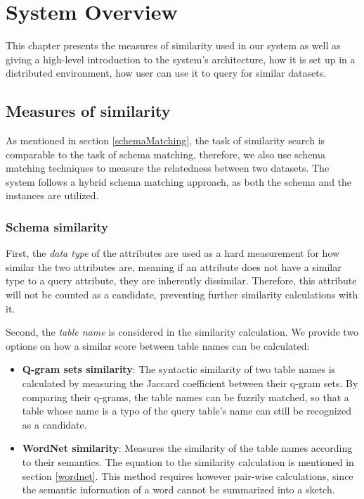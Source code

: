 


\chapter{System Overview}
\label{chap:overview}
\pagestyle{plain}

This chapter presents the measures of similarity used in our system as well as giving a high-level introduction to the system's architecture, how it is set up in a distributed environment, how user can use it to query for similar datasets.

\section{Measures of similarity}\label{simMeasures}

As mentioned in section \ref{schemaMatching}, the task of similarity search is comparable to the task of schema matching, therefore, we also use schema matching techniques to measure the relatedness between two datasets. The system follows a hybrid schema matching approach, as both the schema and the instances are utilized.

\subsection{Schema similarity}\label{schemaSim}

First, the \textit{data type} of the attributes are used as a hard measurement for how similar the two attributes are, meaning if an attribute does not have a similar type to a query attribute, they are inherently dissimilar. Therefore, this attribute will not be counted as a candidate, preventing further similarity calculations with it.

Second, the \textit{table name} is considered in the similarity calculation. We provide two options on how a similar score between table names can be calculated:

\begin{itemize}
    \item \textbf{Q-gram sets similarity}: The syntactic similarity of two table names is calculated by measuring the Jaccard coefficient between their q-gram sets. By comparing their q-grams, the table names can be fuzzily matched, so that a table whose name is a typo of the query table's name can still be recognized as a candidate.
    \item \textbf{WordNet similarity}: Measures the similarity of the table names according to their semantics. The equation to the similarity calculation is mentioned in section \ref{wordnet}. This method requires however pair-wise calculations, since the semantic information of a word cannot be summarized into a sketch.
\end{itemize}

